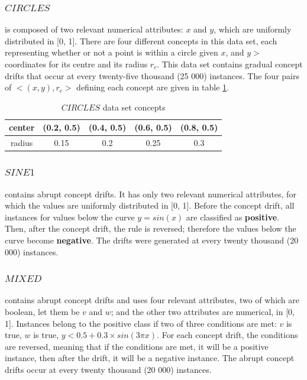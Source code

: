 \documentclass[runningheads]{llncs}
\begin{document}
\subsubsection{$CIRCLES$}
 is composed of two relevant numerical attributes: $x$ and $y$, which are uniformly distributed in [0, 1]. There are four different concepts in this data set, each representing whether or not a point is within a circle given $x$, and $y>$ coordinates for its centre and its radius $r_c$. This data set contains gradual concept drifts that occur at every twenty-five thousand (25 000) instances. The four pairs of $<(x,y), r_c>$ defining each concept are given in table \ref{table:circle_concepts}.

\begin{table}[]
\centering
\caption{\label{table:circle_concepts}$CIRCLES$ data set concepts}
\begin{tabular}{|c|c|c|c|c|}
\hline
center & (0.2, 0.5) & (0.4, 0.5) & (0.6, 0.5) & (0.8, 0.5) \\ \hline
radius & 0.15       & 0.2        & 0.25       & 0.3        \\ \hline
\end{tabular}
\end{table}

\subsubsection{$SINE1$}
contains abrupt concept drifts. It has only two relevant numerical attributes, for which the values are uniformly distributed in [0, 1]. Before the concept drift, all instances for values below the curve $y = sin(x)$ are classified as \textbf{positive}. Then, after the concept drift, the rule is reversed; therefore the values below the curve become \textbf{negative}. The drifts were generated at every twenty thousand (20 000) instances.

\subsubsection{$MIXED$}
contains abrupt concept drifts and uses four relevant attributes, two of which are boolean, let them be $v$ and $w$; and the other two attributes are numerical, in [0, 1]. Instances belong to the positive class if two of three conditions are met: $v$ is true, $w$ is true, $y < 0.5 + 0.3 \times sin(3\pi x)$. For each concept drift, the conditions are reversed, meaning that if the conditions are met, it will be a positive instance, then after the drift, it will be a negative instance. The abrupt concept drifts occur at every twenty thousand (20 000) instances.
\end{document}
